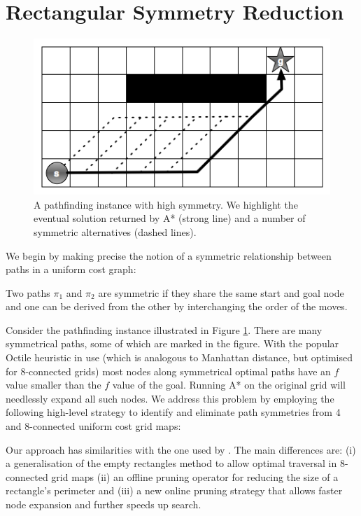 \section{Rectangular Symmetry Reduction}
\label{sec:rsr}

\begin{figure}[]
       \begin{center}
                       \includegraphics[scale=0.36]{diagrams/symmetry_example.png}
       \end{center}
       \caption{A pathfinding instance with high symmetry. We highlight the
eventual solution returned by A* (strong line) and a number of symmetric 
alternatives (dashed lines).}
       \label{fig-symmetry}
		\vspace{-0.5em}
\end{figure}

We begin by making precise the notion of a symmetric relationship between paths
in a uniform cost graph:
\begin{definition}
Two paths $\pi_{1}$ and $\pi_{2}$ are symmetric if they share the same start and
goal node and one can be derived from the other by interchanging the order of the
moves.
\end{definition}

Consider the pathfinding instance illustrated in Figure \ref{fig-symmetry}.
There are many symmetrical paths, some of which are marked in the figure.  With
the popular Octile heuristic in use (which is analogous to Manhattan distance,
but optimised for 8-connected grids) most nodes along symmetrical optimal paths
have an $f$ value smaller than the $f$ value of the goal.  Running A* on the
original grid will needlessly expand all such nodes.  We address this problem by
employing the following high-level strategy to identify and eliminate path
symmetries from 4 and 8-connected uniform cost grid maps:


Our approach has similarities with the one used by
\cite{harabor10}.  The main differences are: (i) a
generalisation of the empty rectangles method to allow optimal traversal in
8-connected grid maps (ii) an offline pruning operator for reducing the size of
a rectangle's perimeter and (iii) a new online pruning strategy that allows faster
node expansion and further speeds up search.

